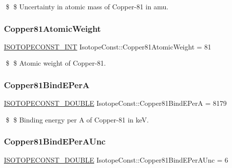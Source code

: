 \$ \$ Uncertainty in atomic mass of Copper-\/81 in amu. \mbox{\label{group___isotope_const-_copper-_cu81_gad66b777a6222066ea04c44733d366a11}} 
\subsubsection{\texorpdfstring{Copper81\+Atomic\+Weight}{Copper81AtomicWeight}}
{\footnotesize\ttfamily \mbox{\hyperlink{group___isotope_const-_macros_ga5f18360b3e99483a35c32d789e62621c}{I\+S\+O\+T\+O\+P\+E\+C\+O\+N\+S\+T\+\_\+\+I\+NT}} Isotope\+Const\+::\+Copper81\+Atomic\+Weight = 81}

\$ \$ Atomic weight of Copper-\/81. \mbox{\label{group___isotope_const-_copper-_cu81_gae0f5370cfdbaa0b0ff53127542d25405}} 
\subsubsection{\texorpdfstring{Copper81\+Bind\+E\+PerA}{Copper81BindEPerA}}
{\footnotesize\ttfamily \mbox{\hyperlink{group___isotope_const-_macros_ga8f45a7272ce02c0b4c65c44636ed719a}{I\+S\+O\+T\+O\+P\+E\+C\+O\+N\+S\+T\+\_\+\+D\+O\+U\+B\+LE}} Isotope\+Const\+::\+Copper81\+Bind\+E\+PerA = 8179}

\$ \$ Binding energy per A of Copper-\/81 in keV. \mbox{\label{group___isotope_const-_copper-_cu81_ga92559c1247980e2d16b7bbdf995eb28d}} 
\subsubsection{\texorpdfstring{Copper81\+Bind\+E\+Per\+A\+Unc}{Copper81BindEPerAUnc}}
{\footnotesize\ttfamily \mbox{\hyperlink{group___isotope_const-_macros_ga8f45a7272ce02c0b4c65c44636ed719a}{I\+S\+O\+T\+O\+P\+E\+C\+O\+N\+S\+T\+\_\+\+D\+O\+U\+B\+LE}} Isotope\+Const\+::\+Copper81\+Bind\+E\+Per\+A\+Unc = 6}

